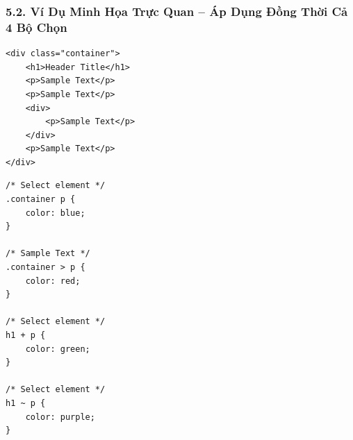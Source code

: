 \documentclass[11pt,oneside]{book}
\begin{document}
\subsubsection{5.2. Ví Dụ Minh Họa Trực Quan -- Áp Dụng Đồng Thời Cả 4 Bộ Chọn}

\begin{codeWindow}
\begin{lstlisting}[language=HTML5]
<div class="container">
    <h1>Header Title</h1>
    <p>Sample Text</p>
    <p>Sample Text</p>
    <div>
        <p>Sample Text</p>
    </div>
    <p>Sample Text</p>
</div>
\end{lstlisting}
\end{codeWindow}

\begin{codeWindow}
\begin{lstlisting}[language=CSS3]
/* Select element */
.container p {
    color: blue;
}

/* Sample Text */
.container > p {
    color: red;
}

/* Select element */
h1 + p {
    color: green;
}

/* Select element */
h1 ~ p {
    color: purple;
}
\end{lstlisting}
\end{codeWindow}
\end{document}
